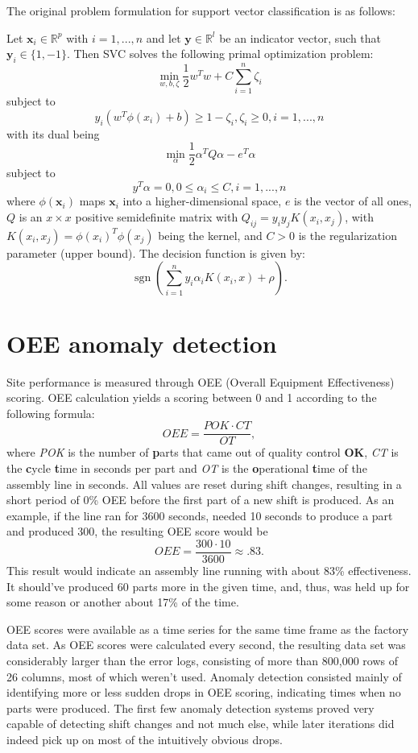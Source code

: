 \documentclass[pdftex,12pt,a4paper]{report}
\begin{document}
The original problem formulation for support vector classification is as follows:\cite{Chang2011-wa}

Let $\boldsymbol{x}_i \in \mathbb{R}^p$ with $i=1,...,n$ and let $\boldsymbol{y} \in \mathbb{R}^l$ be an indicator vector, such that $\boldsymbol{y}_i \in \{1, -1\}$. Then SVC solves the following primal optimization problem:
\[\min_ {w, b, \zeta} \frac{1}{2} w^T w + C \sum_{i=1}^{n} \zeta_i \]
subject to
\[ y_i (w^T \phi (x_i) + b) \geq 1 - \zeta_i,
\zeta_i \geq 0, i=1, ..., n\]
with its dual being
\[\min_{\alpha} \frac{1}{2} \alpha^T Q \alpha - e^T \alpha\]
subject to
\[y^T \alpha = 0,
0 \leq \alpha_i \leq C, i=1, ..., n\]
where $\phi(\boldsymbol{x}_i)$ maps $\boldsymbol{x}_i$ into a higher-dimensional space, $e$ is the vector of all ones, $Q$ is an $x \times x$ positive semidefinite matrix with $Q_{ij} = y_i y_j K(x_i, x_j)$, with $K(x_i, x_j) = \phi(x_i)^T\phi(x_j)$ being the kernel, and $C > 0$ is the regularization parameter (upper bound).
The decision function is given by:
\[\operatorname{sgn}\left(\sum_{i=1}^n y_i \alpha_i K(x_i, x) + \rho\right).\]

\section{OEE anomaly detection}
Site performance is measured through OEE (Overall Equipment Effectiveness) scoring. OEE calculation yields a scoring between 0 and 1 according to the following formula:
\[OEE = \frac{POK \cdot CT}{OT},\]
where \textit{POK} is the number of \textbf{p}arts that came out of quality control \textbf{OK}, \textit{CT} is the \textbf{c}ycle \textbf{t}ime in seconds per part and \textit{OT} is the \textbf{o}perational \textbf{t}ime of the assembly line in seconds. All values are reset during shift changes, resulting in a short period of 0\% OEE before the first part of a new shift is produced. As an example, if the line ran for 3600 seconds, needed 10 seconds to produce a part and produced 300, the resulting OEE score would be
\[OEE = \frac{300 \cdot 10}{3600}\approx .83. \]
This result would indicate an assembly line running with about 83\% effectiveness. It should've produced 60 parts more in the given time, and, thus, was held up for some reason or another about 17\% of the time.

OEE scores were available as a time series for the same time frame as the factory data set. As OEE scores were calculated every second, the resulting data set was considerably larger than the error logs, consisting of more than 800,000 rows of 26 columns, most of which weren't used. Anomaly detection consisted mainly of identifying more or less sudden drops in OEE scoring, indicating times when no parts were produced. The first few anomaly detection systems proved very capable of detecting shift changes and not much else, while later iterations did indeed pick up on most of the intuitively obvious drops.
\end{document}
